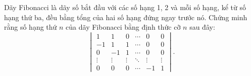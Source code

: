 \begin{exercise}
    Dãy Fibonacci là dãy số bắt đầu với các số hạng 1, 2 và mỗi số hạng, kể từ số hạng thứ ba, đều bằng tổng của hai số hạng đứng ngay trước nó. Chứng minh rằng số hạng thứ $n$ của dãy Fibonacci bằng định thức cỡ $n$ sau đây:
    \[
        \begin{vmatrix}
            1      & 1      & 0      & \cdots & 0      & 0      \\
            -1     & 1      & 1      & \cdots & 0      & 0      \\
            0      & -1     & 1      & \cdots & 0      & 0      \\
            \vdots & \vdots & \vdots & \ddots & \vdots & \vdots \\
            0      & 0      & 0      & \cdots & -1     & 1
        \end{vmatrix}.
    \]
\end{exercise}

